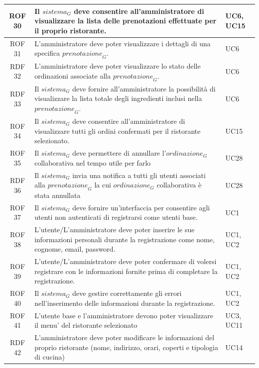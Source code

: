 \documentclass[12pt, oneside]{article}
\begin{document}
\begin{longtable}{|c|p{14cm}|p{2cm}|}
    ROF 30& Il $\textit{sistema}_G$ deve consentire all'amministratore di visualizzare la lista delle prenotazioni effettuate per il proprio ristorante. & UC6, UC15 \\
    \hline
    ROF 31& L'amministratore deve poter visualizzare i dettagli di una specifica $\textit{prenotazione}_G$. & UC6 \\
    \hline
    RDF 32& L'amministratore deve poter visualizzare lo stato delle ordinazioni associate alla $\textit{prenotazione}_G$. & UC6 \\
    \hline
    RDF 33& Il $\textit{sistema}_G$ deve fornire all'amministratore la possibilità di visualizzare la lista totale degli ingredienti inclusi nella $\textit{prenotazione}_G$. & UC6 \\
    \hline
    ROF 34& Il $\textit{sistema}_G$ deve consentire all'amministratore di visualizzare tutti gli ordini confermati per il ristorante selezionato. & UC15 \\
    \hline
    ROF 35& Il $\textit{sistema}_G$ deve permettere di annullare l'$\textit{ordinazione}_G$ collaborativa nel tempo utile per farlo & UC28 \\
    \hline
    RDF 36& Il $\textit{sistema}_G$ invia una notifica a tutti gli utenti associati alla $\textit{prenotazione}_G$ la cui $\textit{ordinazione}_G$ collaborativa è stata annullata & UC28 \\
    \hline
    ROF 37& Il $\textit{sistema}_G$ deve fornire un'interfaccia per consentire agli utenti non autenticati di registrarsi come utenti base. & UC1 \\
    \hline
    ROF 38& L'utente/L'amministratore deve poter inserire le sue informazioni personali durante la registrazione come nome, cognome, email, password. & UC1, UC2 \\
    \hline
    ROF 39& L'utente/L'amministratore deve poter confermare di volersi registrare con le informazioni fornite prima di completare la registrazione. & UC1, UC2 \\
    \hline
    ROF 40& Il $\textit{sistema}_G$ deve gestire correttamente gli errori nell'inserimento delle informazioni durante la registrazione. & UC1, UC2 \\
    \hline 
    ROF 41& L'utente base e l'amministratore devono poter visualizzare il menu' del ristorante selezionato & UC3, UC11\\
    \hline
    RDF 42& L'amministratore deve poter modificare le informazioni del proprio ristorante (nome, indirizzo, orari, coperti e tipologia di cucina) & UC14\\

\end{longtable}
\end{document}
